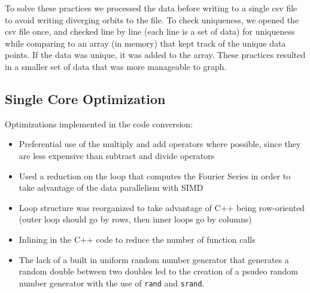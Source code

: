 \documentclass[12pt]{article}
\newcommand{\bi}{\begin{itemize}}
\newcommand{\ei}{\end{itemize}}
\begin{document}
To solve these practices we processed the data before writing to a
single csv file to avoid writing diverging orbits to the file. To
check uniqueness, we opened the csv file once, and checked line by line
(each line is a set of data) for uniqueness while comparing to an
array (in memory) that kept track of the unique data points. If the
data was unique, it was added to the array. These practices resulted
in a smaller set of data that was more manageable to graph.

\subsection{Single Core Optimization}
Optimizations implemented in the code conversion:
\bi
\item Preferential use of the  multiply and add operators where possible, since
they are less expensive than subtract and divide operators
\item Used a reduction on the loop that computes the Fourier Series
  in order to take advantage of the data parallelism with SIMD
\item Loop structure was reorganized to take advantage of C++ being
  row-oriented (outer loop should go by rows, then inner loops go by columns)
\item Inlining in the C++ code to reduce the number of function calls
\item The lack of a built in uniform random number generator that generates a random
double between two doubles led to the creation of a psudeo random number
generator with the use of \texttt{rand} and \texttt{srand}.

\ei
\end{document}
